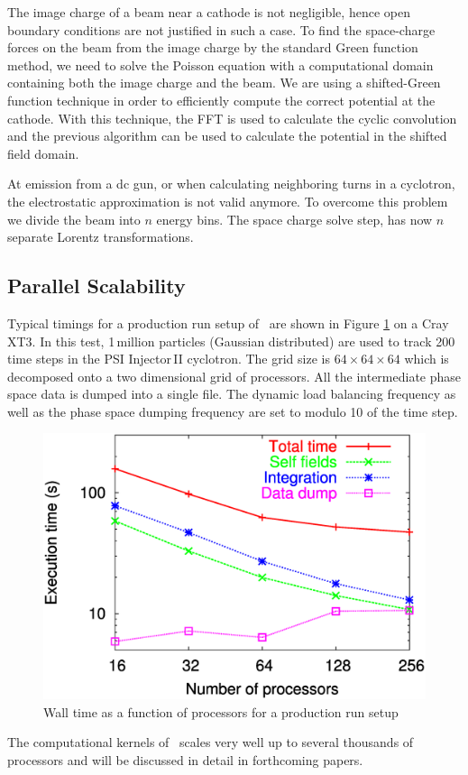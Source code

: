 \documentclass[acus]{JAC2003}
\begin{document}
The image charge of a beam near a cathode is not negligible, hence
open boundary conditions are not justified in such a case. To find the space-charge forces on the beam from
the image charge by the standard Green function method,
we need to solve the Poisson equation with a computational
domain containing both the image charge and the beam.
We are using a shifted-Green function \cite{shgreen} technique in order to efficiently compute the correct potential at the cathode.
With this technique, the FFT is used to calculate the cyclic convolution
and the previous algorithm can be used to calculate the
potential in the shifted field domain.

At  emission from a dc gun, or when calculating neighboring turns in a cyclotron, the electrostatic approximation is not valid anymore. To overcome this problem
we divide the beam into $n$ energy bins. The space charge solve step, has now $n$ separate Lorentz transformations. 
\subsection{Parallel Scalability}
Typical timings for a production run setup of \opal\ are shown in Figure \ref{scalability} on a Cray XT3. 
In this test, 1\,million particles (Gaussian distributed) are used to track 200 time steps in the PSI Injector\,II cyclotron. The grid size is $64 \times 64 \times 64$ which is decomposed onto a two dimensional grid of processors. All the intermediate phase space data is dumped into 
a single \hfifepart file. The dynamic load balancing frequency as well as the phase space dumping frequency are set to modulo 10 of the time step.
\begin{figure}[ht!]
\begin{center}
\includegraphics[width=.50\linewidth]{Timing64mesh.ps}
\vspace{+3mm}
  \caption{Wall time as a function of processors for a production run setup}
  \label{scalability}
\end{center}
\end{figure}
The computational kernels of \opal\ scales very well up to several thousands of processors and will be discussed in detail in forthcoming papers. 
\end{document}
